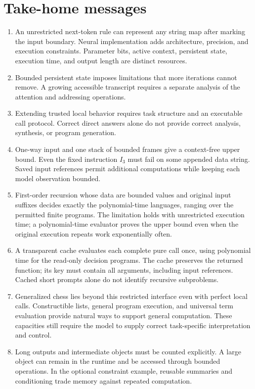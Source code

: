 \documentclass[11pt,twoside]{article}
\theoremstyle{definition}
\theoremstyle{remark}
\begin{document}
\section{Take-home messages}
\label{sec:take-home}
\begin{enumerate}[leftmargin=*]
\item An unrestricted next-token rule can represent any string map after
marking the input boundary. Neural implementation adds architecture,
precision, and execution constraints. Parameter bits, active context,
persistent state, execution time, and output length are distinct resources.
\item Bounded persistent state imposes limitations that more iterations
cannot remove. A growing accessible transcript requires a separate analysis
of the attention and addressing operations.
\item Extending trusted local behavior requires task structure and an
executable call protocol. Correct direct answers alone do not provide
correct analysis, synthesis, or program generation.
\item One-way input and one stack of bounded frames give a context-free
upper bound. Even the fixed instruction $I_3$ must fail on some appended
data string. Saved input references permit additional computations while
keeping each model observation bounded.
\item First-order recursion whose data are bounded values and original
input suffixes decides exactly the polynomial-time languages, ranging over
the permitted finite programs. The limitation holds with unrestricted
execution time; a polynomial-time evaluator proves the upper bound even
when the original execution repeats work exponentially often.
\item A transparent cache evaluates each complete pure call once, using
polynomial time for the read-only decision programs. The cache preserves
the returned function; its key must contain all arguments, including input
references. Cached short prompts alone do not identify recursive subproblems.
\item Generalized chess lies beyond this restricted interface even with
perfect local calls. Constructible lists, general program execution, and
universal term evaluation provide natural ways to support general computation.
These capacities still require the model to supply correct task-specific
interpretation and control.
\item Long outputs and intermediate objects must be counted explicitly.
A large object can remain in the runtime and be accessed through bounded
operations. In the optional constraint example, reusable summaries and
conditioning trade memory against repeated computation.
\end{enumerate}
\end{document}
